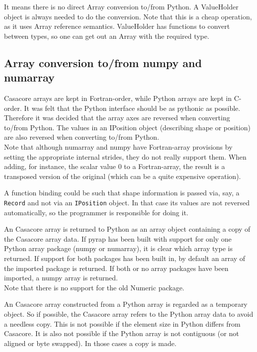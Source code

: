It means there is no direct Array conversion to/from Python. A
ValueHolder object is always needed to do the conversion. Note that
this is a cheap operation, as it uses Array reference semantics.
ValueHolder has functions to convert between types, so one can get
out an Array with the required type.

\subsection{Array conversion to/from numpy and numarray}
Casacore arrays are kept in Fortran-order, while Python arrays are kept
in C-order. It was felt that the Python interface should be as 
pythonic as possible. Therefore it was decided that the array axes are
reversed when converting to/from Python.
The values in an IPosition object (describing shape or
position) are also reversed when converting to/from Python.
\\Note that although numarray and numpy have Fortran-array provisions
by setting the appropriate internal strides,
they do not really support them. When adding, for instance, the scalar
value 0 to a Fortran-array, the  result is a transposed version of the
original (which can be a quite expensive operation).

A function binding could be such that shape information is passed via, say, a
\texttt{Record} and not via an \texttt{IPosition} object.
In that case its values
are not reversed automatically, so the programmer is
responsible for doing it.

An Casacore array is returned to Python as an array object
containing a copy of the Casacore array data. If pyrap has
been built with support for only one Python array package (numpy or numarray),
it is clear which array type is returned. If support for both
packages has been built in, by default an array of the imported
package is returned. If both or no array packages have been imported, a numpy
array is returned.
\\Note that there is no support for the old Numeric package.

An Casacore array constructed from a Python array is regarded as a
temporary object. So if possible, the Casacore array refers to the
Python array data to avoid a needless copy. This is not possible if
the element size in Python differs from Casacore. It is also not
possible if the Python array is not contiguous (or not aligned or
byte swapped). In those cases a copy is made.

